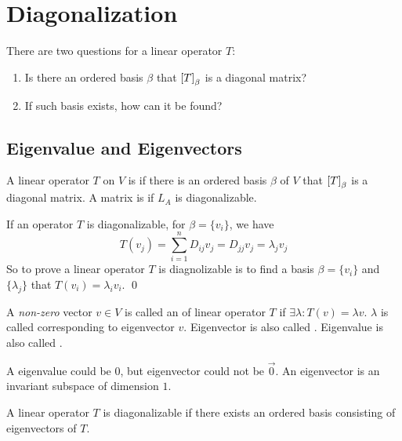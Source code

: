 \section{Diagonalization}


There are two questions for a linear operator $T$:
\begin{enumerate}
    \item Is there an ordered basis $\beta$ that $\coordinate{T}_\beta$ is a diagonal matrix?
    \item If such basis exists, how can it be found?
\end{enumerate}


\subsection{Eigenvalue and Eigenvectors}

\begin{definition}
    A linear operator $T$ on $V$ is  if there is an ordered basis $\beta$ of $V$ that $\coordinate{T}_\beta$ is a diagonal matrix. A matrix is  if $L_A$ is diagonalizable.


If an operator $T$ is diagonalizable, for $\beta = \{v_i\}$, we have
\begin{equation*}
    T(v_j) = \sum_{i=1}^n D_{ij} v_j = D_{jj} v_j = \lambda_j v_j
\end{equation*}
So to prove a  linear operator $T$ is diagnolizable is to find a basis $\beta = \{ v_i \}$ and $\{ \lambda_j \}$ that $T(v_i) = \lambda_i v_i$.
\qed
\end{definition}

\begin{definition}
    A \emph{non-zero} vector $v \in V$ is called an  of linear operator $T$ if $\exists \lambda : T(v) = \lambda v$. $\lambda$ is called  corresponding to eigenvector $v$. Eigenvector is also called . Eigenvalue is also called .

    
    
    A eigenvalue could be $0$, but eigenvector could not be $\vec{0}$. An eigenvector is an invariant subspace of dimension $1$.
\end{definition}


\begin{theorem}
    A linear operator $T$ is diagonalizable if there exists an ordered basis consisting of eigenvectors of $T$.
\end{theorem}

